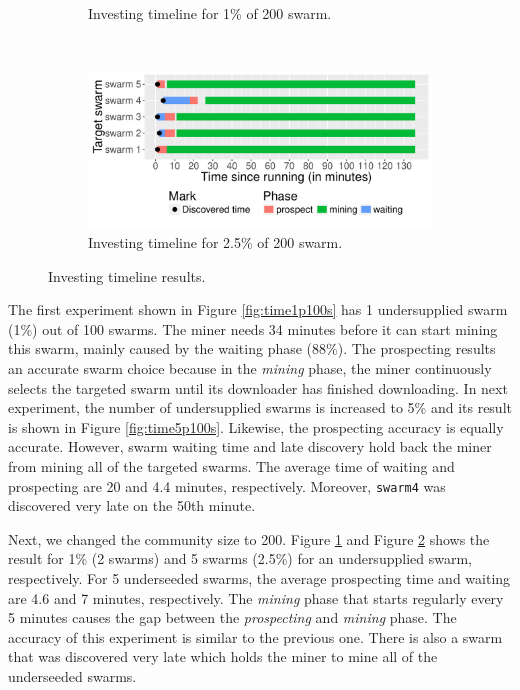 \begin{figure}[th]
\begin{adjustwidth}{-1.5cm}{}
\begin{subfigure}[t]{0.6\textwidth}
		\caption{Investing timeline for 1\% of 200 swarm.}
		\label{fig:time1p200s}
	\end{subfigure}
	~
	\begin{subfigure}[t]{0.6\textwidth}
		\centering
		\includegraphics[width=\textwidth]{pics/results/time-25p200s.pdf}
		\caption{Investing timeline for 2.5\% of 200 swarm.}
		\label{fig:time2p200s}
	\end{subfigure}
	\caption{Investing timeline results.}
	\label{fig:timeprosexp}
\end{adjustwidth}
\end{figure}

The first experiment shown in Figure \ref{fig:time1p100s} has 1 undersupplied swarm (1\%) out of 100 swarms. The miner needs 34 minutes before it can start mining this swarm, mainly caused by the waiting phase (88\%). The prospecting results an accurate swarm choice because in the \textit{mining} phase, the miner continuously selects the targeted swarm until its downloader has finished downloading. In next experiment, the number of undersupplied swarms is increased to 5\% and its result is shown in Figure \ref{fig:time5p100s}. Likewise, the prospecting accuracy is equally accurate. However, swarm waiting time and late discovery hold back the miner from mining all of the targeted swarms. The average time of waiting and prospecting are 20 and 4.4 minutes, respectively. Moreover, \texttt{swarm4} was discovered very late on the 50th minute.

Next, we changed the community size to 200. Figure \ref{fig:time1p200s} and Figure \ref{fig:time2p200s} shows the result for 1\% (2 swarms) and 5 swarms (2.5\%) for an undersupplied swarm, respectively. For 5 underseeded swarms, the average prospecting time and waiting are 4.6 and 7 minutes, respectively. The \textit{mining} phase that starts regularly every 5 minutes causes the gap between the \textit{prospecting} and \textit{mining} phase. The accuracy of this experiment is similar to the previous one. There is also a swarm that was discovered very late which holds the miner to mine all of the underseeded swarms.

